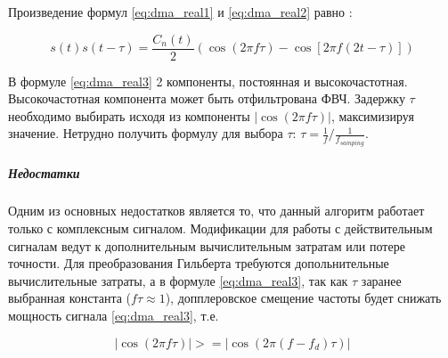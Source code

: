 Произведение формул \ref{eq:dma_real1} и \ref{eq:dma_real2} равно \cite{tsui}:
\begin{center}
\begin{equation}
	\label{eq:dma_real3}
	s(t)s(t - \tau) = \frac{C_n(t)}{2} \left(\cos (2\pi f \tau) - \cos \left[2 \pi f (2t - \tau)\right]\right)
\end{equation}
\end{center}

В формуле \ref{eq:dma_real3} 2 компоненты, постоянная и высокочастотная. Высокочастотная компонента
может быть отфильтрована ФВЧ. Задержку ${\tau}$ необходимо выбирать исходя из компоненты ${\left| \cos (2\pi f \tau) \right|}$,
максимизируя значение. Нетрудно получить формулу для выбора ${\tau}$: ${\tau = \frac{1}{f} / \frac{1}{f_{samping}}}$.

\subparagraph{Недостатки}

Одним из основных недостатков является то, что данный алгоритм работает только с комплексным сигналом. Модификации
для работы с действительным сигналам ведут к дополнительным вычислительным затратам или потере точности. Для
преобразования Гильберта требуются допольнительные вычислительные затраты, а в формуле \ref{eq:dma_real3}, так
как ${\tau}$ заранее выбранная константа (${f\tau \approx 1}$), допплеровское смещение частоты будет снижать мощность
сигнала \ref{eq:dma_real3}, т.е.
\begin{center}
\begin{equation}
	\left| \cos (2\pi f \tau) \right| >= \left| \cos (2\pi (f - f_d) \tau) \right|
\end{equation}
\end{center}

\newpage
